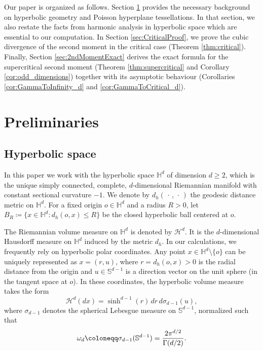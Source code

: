 \documentclass[11pt,a4paper]{article}
\theoremstyle{plain}
\theoremstyle{definition}
\theoremstyle{remark}
\def\HH{\mathbb{H}}
\def\SS{\mathbb{S}}
\def\cH{\mathcal{H}}
\begin{document}
\smallskip

Our paper is organized as follows. Section \ref{sec:preliminaries} provides the necessary background on hyperbolic geometry and Poisson hyperplane tessellations. In that section, we also restate the facts from harmonic analysis in hyperbolic space which are essential to our computation. In Section \ref{sec:CriticalProof}, we prove the cubic divergence of the second moment in the critical case (Theorem \ref{thm:critical}). Finally, Section \ref{sec:2ndMomentExact} derives the exact formula for the supercritical second moment (Theorem \ref{thm:supercritical} and Corollary \ref{cor:odd_dimensions}) together with its asymptotic behaviour (Corollaries \ref{cor:GammaToInfinity_d} and \ref{cor:GammaToCritical_d}). 



\section{Preliminaries}\label{sec:preliminaries}

\subsection{Hyperbolic space}

In this paper we work with the hyperbolic space $\mathbb{H}^d$ of dimension $d \ge 2$, which is the unique simply connected, complete, $d$-dimensional Riemannian manifold with constant sectional curvature $-1$. We denote by $d_h(\,\cdot\,,\,\cdot\,)$ the geodesic distance metric on $\mathbb{H}^d$. For a fixed origin $o \in \mathbb{H}^d$ and a radius $R>0$, let $B_R \coloneqq \{x \in \mathbb{H}^d : d_h(o,x) \le R\}$ be the closed hyperbolic ball centered at $o$.

The Riemannian volume measure on $\mathbb{H}^d$ is denoted by $\cH^d$. It is the $d$-dimensional Hausdorff measure on $\HH^d$ induced by the metric $d_h$. In our calculations, we frequently rely on hyperbolic polar coordinates. Any point $x \in \mathbb{H}^d \setminus \{o\}$ can be uniquely represented as $x=(r, u)$, where $r = d_h(o,x) > 0$ is the radial distance from the origin and $u \in \mathbb{S}^{d-1}$ is a direction vector on the unit sphere (in the tangent space at $o$). In these coordinates, the hyperbolic volume measure takes the form
\begin{equation}\label{eq:PolarCoordinates}
\cH^d(dx) = \sinh^{d-1}(r) \, dr \, d\sigma_{d-1}(u),
\end{equation}
where $\sigma_{d-1}$ denotes the spherical Lebesgue measure on $\mathbb{S}^{d-1}$, normalized such that
$$
\omega_d\coloneqq\sigma_{d-1}(\SS^{d-1})={2\pi^{d/2}\over\Gamma(d/2)}.
$$
\end{document}
